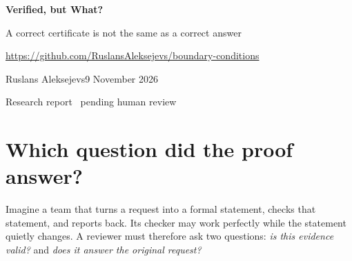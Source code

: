 \documentclass[11pt]{article}
\begin{document}
{\color{ink}\fontsize{29}{34}\selectfont\textbf{Verified, but What?}\par}
\vspace{3pt}
{\large A correct certificate is not the same as a correct answer\par}
\vspace{7pt}
\url{https://github.com/RuslansAleksejevs/boundary-conditions}\par
Ruslans Aleksejevs\hfill 9 November 2026\par
{\small\color{quiet}Research report \textperiodcentered\ pending human review\par}

\begin{abstract}
A proof can be correct even when it proves the wrong statement. We test whether
a model reviewer mistakes a valid certificate for an altered task as evidence
about the original. Our small, fully checkable environment uses four Boolean
inputs: every answer can be tested against all 16 possible states. We separate
ordinary model translation from deliberately planted changes, then show the same
candidate and certificate with a PASS heading, a neutral heading or an explicit
candidate-only scope warning. The original task and an instruction to check the
match remain visible in every condition. After a development pilot, the frozen
Qwen3.5-122B-A10B evaluation covered 100 new original contracts. Each presentation
correctly rejected all 40 planted substitutions and accepted all 20 equivalent
rewrites. Both paired false-SAFE differences were zero; conservative intervals
still span about minus to plus 43 percentage points. In the natural pipeline,
37 valid translations preserved the contract, while three malformed translations
and one malformed review reduced useful completion to 36/40. Two recorded
examples make the distinction concrete: a reversed implication was rejected,
and a redundant condition was accepted. The contribution is an auditable
measurement setup and a bounded negative result, not a new theory of mathematical
equivalence, a demonstrated benefit from scope labels or a general safety guarantee.
\end{abstract}

\section{Which question did the proof answer?}
Imagine a team that turns a request into a formal statement, checks that statement,
and reports back. Its checker may work perfectly while the statement quietly
changes. A reviewer must therefore ask two questions: \emph{is this evidence valid?}
and \emph{does it answer the original request?}
\end{document}
